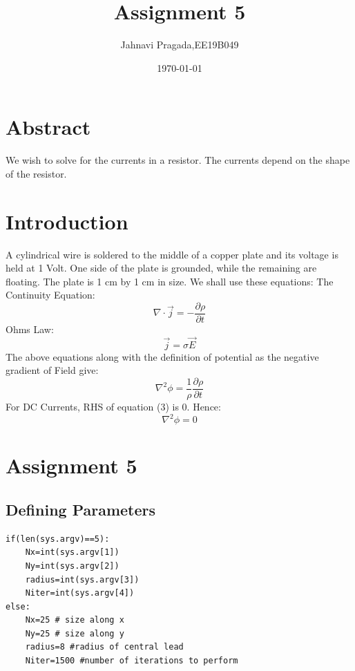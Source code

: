 \documentclass{article}
\title{Assignment 5}
\author{Jahnavi Pragada,EE19B049}
\date{\today}
\begin{document}
\maketitle

\section*{Abstract}
We wish to solve for the currents in a resistor. The currents depend on the shape of the resistor.

\section*{Introduction}
A  cylindrical wire is soldered to the middle of a copper plate and its voltage is held at 1 Volt.  One side of the plate is grounded, while the remaining are floating. The plate is 1 cm by 1 cm in size.\newline
We shall use these equations:\newline
The Continuity Equation:
\begin{equation}
    \nabla \cdot \vec{j} = - \frac{\partial\rho}{\partial t}
\end{equation}
Ohms Law:
\begin{equation}
    \vec{j} = \sigma\vec{E}
\end{equation}
The above equations along with the definition of potential as the negative gradient of Field give:
\begin{equation}
    \nabla^2 \phi =  \frac{1}{\rho}\frac{\partial\rho}{\partial t}
\end{equation}
For DC Currents, RHS of equation (3) is 0. Hence:
\begin{equation}
    \nabla^2 \phi =  0
\end{equation}

\section*{Assignment 5}
\subsection*{Defining Parameters}

\lstset{language=Python}
\lstset{basicstyle=\footnotesize}
\begin{lstlisting}
if(len(sys.argv)==5):
    Nx=int(sys.argv[1])
    Ny=int(sys.argv[2])
    radius=int(sys.argv[3])  
    Niter=int(sys.argv[4])
else:
    Nx=25 # size along x
    Ny=25 # size along y
    radius=8 #radius of central lead
    Niter=1500 #number of iterations to perform
    
\end{lstlisting}
\end{document}
